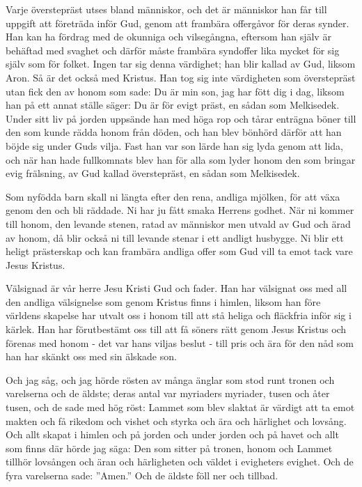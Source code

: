 Varje överstepräst utses bland människor, och det är människor han får till uppgift att företräda inför Gud, genom att frambära offergåvor för deras synder.
Han kan ha fördrag med de okunniga och vilsegångna, eftersom han själv är behäftad med svaghet
och därför måste frambära syndoffer lika mycket för sig själv som för folket.
Ingen tar sig denna värdighet; han blir kallad av Gud, liksom Aron.
Så är det också med Kristus. Han tog sig inte värdigheten som överstepräst utan fick den av honom som sade: Du är min son, jag har fött dig i dag,
liksom han på ett annat ställe säger: Du är för evigt präst, en sådan som Melkisedek.
Under sitt liv på jorden uppsände han med höga rop och tårar enträgna böner till den som kunde rädda honom från döden, och han blev bönhörd därför att han böjde sig under Guds vilja.
Fast han var son lärde han sig lyda genom att lida,
och när han hade fullkomnats blev han för alla som lyder honom den som bringar evig frälsning,
av Gud kallad överstepräst, en sådan som Melkisedek.

\newpage
{}

Som nyfödda barn skall ni längta efter den rena, andliga mjölken, för att växa genom den och bli räddade.
Ni har ju fått smaka Herrens godhet.
När ni kommer till honom, den levande stenen, ratad av människor men utvald av Gud och ärad av honom,
då blir också ni till levande stenar i ett andligt husbygge. Ni blir ett heligt prästerskap och kan frambära andliga offer som Gud vill ta emot tack vare Jesus Kristus.



Välsignad är vår herre Jesu Kristi Gud och fader. Han har välsignat oss med all den andliga välsignelse som genom Kristus finns i himlen,
liksom han före världens skapelse har utvalt oss i honom till att stå heliga och fläckfria inför sig i kärlek.
Han har förutbestämt oss till att få söners rätt genom Jesus Kristus och förenas med honom - det var hans viljas beslut -
till pris och ära för den nåd som han har skänkt oss med sin älskade son.



Och jag såg, och jag hörde rösten av många änglar som stod runt tronen och varelserna och de äldste; deras antal var myriaders myriader, tusen och åter tusen,
och de sade med hög röst: Lammet som blev slaktat är värdigt att ta emot makten och få rikedom och vishet och styrka och ära och härlighet och lovsång.
Och allt skapat i himlen och på jorden och under jorden och på havet och allt som finns där hörde jag säga: Den som sitter på tronen, honom och Lammet tillhör lovsången och äran och härligheten och väldet i evigheters evighet.
Och de fyra varelserna sade: ”Amen.” Och de äldste föll ner och tillbad.


